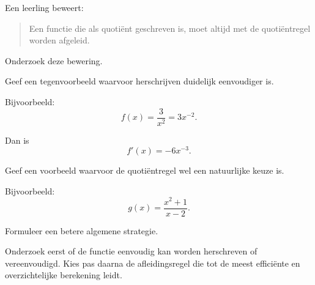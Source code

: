 \documentclass{ximera}
\begin{document}

\begin{oefening}{\oefG}

Een leerling beweert:

\begin{quote}
Een functie die als quotiënt geschreven is, moet altijd met de
quotiëntregel worden afgeleid.
\end{quote}

Onderzoek deze bewering.

\begin{question}
Geef een tegenvoorbeeld waarvoor herschrijven duidelijk eenvoudiger is.

\begin{oplossing}
Bijvoorbeeld:
\[
f(x)=\frac{3}{x^2}=3x^{-2}.
\]

Dan is
\[
f'(x)=-6x^{-3}.
\]
\end{oplossing}
\end{question}


\begin{question}
Geef een voorbeeld waarvoor de quotiëntregel wel een natuurlijke
keuze is.

\begin{oplossing}
Bijvoorbeeld:
\[
g(x)=\frac{x^2+1}{x-2}.
\]
\end{oplossing}
\end{question}


\begin{question}
Formuleer een betere algemene strategie.

\begin{oplossing}
Onderzoek eerst of de functie eenvoudig kan worden herschreven of
vereenvoudigd. Kies pas daarna de afleidingsregel die tot de meest
efficiënte en overzichtelijke berekening leidt.
\end{oplossing}
\end{question}

\end{oefening}


\FVDendExercises
\end{document}
